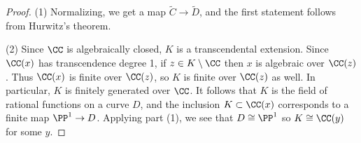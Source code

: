 \begin{proof}
\noindent (1) Normalizing, we get a map  $ \tilde C \to \tilde D$, and
the first statement follows from
Hurwitz's theorem.
%

\smallbreak

\noindent (2) Since $\CC$ is algebraically closed,
$K$ is a
transcendental extension.
%
\vadjust{\allowbreak}%
Since $\CC(x)$ has
transcendence degree 1, if $z\in K\setminus \CC$
then $x$ is algebraic over $\CC(z)$. Thus $\CC(x)$ is finite over $\CC(z)$, so $K$ is finite over $\CC(z)$
as well. In particular, $K$ is finitely generated over $\CC$. It follows that $K$ is the field of rational functions
on a curve $D$, and the inclusion $K\subset \CC(x)$ corresponds to a finite map $\PP^1\to D$. Applying
part (1),
we see that $D\cong \PP^1$ so $K \cong \CC(y)$ for some $y$.
\end{proof}

